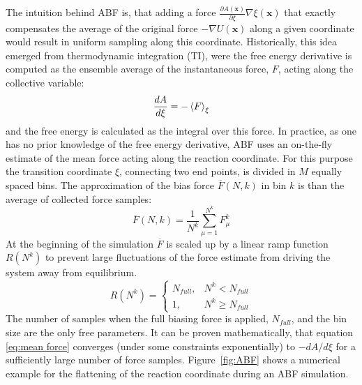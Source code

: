 The intuition behind ABF is, that adding a force $\frac{\partial A(\textbf{x})}{\partial \xi}\nabla\xi(\textbf{x})$ that exactly compensates the average of the original force $-\nabla U(\textbf{x})$ along a given coordinate would result in uniform sampling along this coordinate.\autocite{comer2015adaptive}
Historically, this idea emerged from thermodynamic integration (TI), were the free energy derivative  is computed as the ensemble average of the instantaneous force, $F$, acting along the collective variable:
\begin{equation}
\frac{dA}{d\xi} = -\braket{F}_{\xi}
\end{equation}
and the free energy is calculated as the integral over this force.\autocite{kirkwood1935statistical,zwanzig1954high}
In practice, as one has no prior knowledge of the free energy derivative, ABF uses an on-the-fly estimate of the mean force acting along the reaction coordinate. For this purpose the transition coordinate $\xi$, connecting two end points, is divided in $M$ equally spaced bins. The approximation of the bias force $\overline{F}(N,k)$ in bin $k$ is than the average of collected force samples:\autocite{comer2015adaptive}
\begin{equation}
  \overline{F}(N,k) = \frac{1}{N^{k}} \sum_{\mu=1}^{N^{k}} F_{\mu}^{k}
  \label{eq:mean force}
\end{equation}
At the beginning of the simulation $\overline{F}$ is scaled up by a linear ramp function $R(N^k)$ to prevent large fluctuations of the force estimate from driving the system away from equilibrium.
\begin{equation}
  R(N^k)=\left\{\begin{array}{ll} N_{full}, & N^{k} < N_{full} \\
                                           1, & N^{k} \geq  N_{full} \end{array}\right. \label{eq:ramp}
\end{equation}
The number of samples when the full biasing force is applied, $N_{full}$, and the bin size are the only free parameters.
It can be proven mathematically, that equation \ref{eq:mean force} converges (under some constraints exponentially) to $-dA/d\xi$ for a sufficiently large number of force samples.\autocite{alrachid2015long}
Figure~\ref{fig:ABF} shows a numerical example for the flattening of the reaction coordinate during an ABF simulation.

